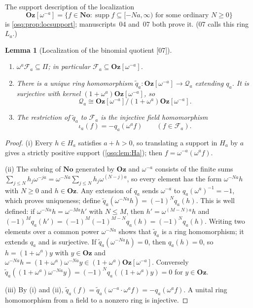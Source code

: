 \documentclass[11pt,letterpaper]{article}
\numberwithin{equation}{section}
\newtheorem{lemma}[lemma]{Lemma}
\theoremstyle{definition}
\theoremstyle{remark}
\theoremstyle{plain}
\newcommand{\No}{\mathbf{No}}
\newcommand{\Oz}{\mathbf{Oz}}
\newcommand{\FF}{\mathscr F}         %
\newcommand{\Qa}{\mathcal Q}         %
\newcommand{\supp}{\operatorname{supp}}
\newcommand{\src}[1]{\textup{\textsf{[#1]}}}
\begin{document}
The support description of the localization
\[
 \Oz[\omega^{-a}]=\{f\in\No:\supp f\subseteq[-Na,\infty)\text{ for some ordinary }N\ge0\}
\]
is \cref{osq:prop:locsupport}; manuscripts~04 and~07 both prove it. (07 calls this ring
$L_a$.)

\begin{lemma}[Localization of the binomial quotient \src{07}]\label{osq:if:lem:localization}
\leavevmode
\begin{enumerate}
\item $\omega^a\FF_a\subseteq\Pi$; in particular $\FF_a\subseteq\Oz[\omega^{-a}]$.
\item There is a unique ring homomorphism $\widetilde q_a:\Oz[\omega^{-a}]\to\Qa_a$
extending $q_a$. It is surjective with kernel $(1+\omega^a)\Oz[\omega^{-a}]$, so
\begin{equation}\label{osq:if:eq:localquotient}
 \Qa_a\cong\Oz[\omega^{-a}]/(1+\omega^a)\Oz[\omega^{-a}] .
\end{equation}
\item The restriction of $\widetilde q_a$ to $\FF_a$ is the injective field homomorphism
\begin{equation}\label{osq:if:eq:iota}
 \iota_a(f)=-q_a(\omega^af)\qquad(f\in\FF_a).
\end{equation}
\end{enumerate}
\end{lemma}

\begin{proof}
(i) Every $h\in H_a$ satisfies $a+h>0$, so translating a support in $H_a$ by $a$ gives a
strictly positive support (\cref{osq:lem:Ha}); then $f=\omega^{-a}(\omega^af)$.

(ii) The subring of $\No$ generated by $\Oz$ and $\omega^{-a}$ consists of the finite sums
$\sum_{j\le N}h_j\omega^{-ja}=\omega^{-Na}\sum_{j\le N}h_j\omega^{(N-j)a}$, so every element
has the form $\omega^{-Na}h$ with $N\ge0$ and $h\in\Oz$. Any extension of $q_a$ sends
$\omega^{-a}$ to $q_a(\omega^a)^{-1}=-1$, which proves uniqueness; define
$\widetilde q_a(\omega^{-Na}h)=(-1)^Nq_a(h)$. This is well defined: if
$\omega^{-Na}h=\omega^{-Ma}h'$ with $N\le M$, then $h'=\omega^{(M-N)a}h$ and
$(-1)^Mq_a(h')=(-1)^M(-1)^{M-N}q_a(h)=(-1)^Nq_a(h)$. Writing two elements over a common
power $\omega^{-Na}$ shows that $\widetilde q_a$ is a ring homomorphism; it extends $q_a$
and is surjective. If $\widetilde q_a(\omega^{-Na}h)=0$, then $q_a(h)=0$, so
$h=(1+\omega^a)y$ with $y\in\Oz$ and
$\omega^{-Na}h=(1+\omega^a)\omega^{-Na}y\in(1+\omega^a)\Oz[\omega^{-a}]$. Conversely
$\widetilde q_a((1+\omega^a)\omega^{-Na}y)=(-1)^Nq_a((1+\omega^a)y)=0$ for $y\in\Oz$.

(iii) By (i) and (ii), $\widetilde q_a(f)=\widetilde q_a(\omega^{-a}\cdot\omega^af)
=-q_a(\omega^af)$. A unital ring homomorphism from a field to a nonzero ring is injective.
\end{proof}
\end{document}
